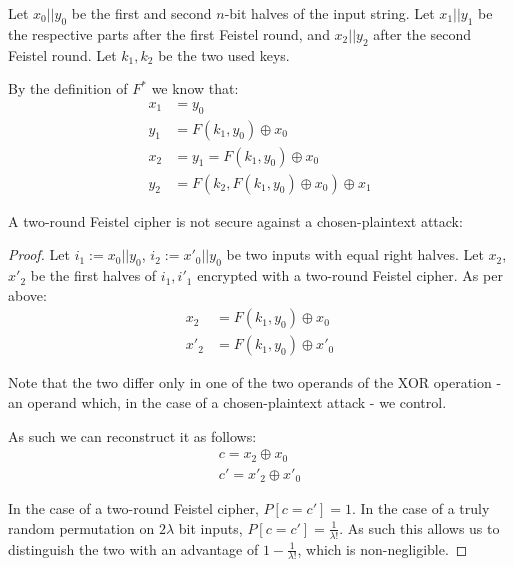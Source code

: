 \documentclass[a4paper]{scrreprt}
\begin{document}
Let $x_0 || y_0$ be the first and second $n$-bit halves of the input string.
Let $x_1 || y_1$ be the respective parts after the first Feistel round, and
$x_2 || y_2$ after the second Feistel round. Let $k_1, k_2$ be the two used
keys.

By the definition of $F^*$ we know that:
\begin{align*}
	x_1 & = y_0 \\
	y_1 & = F(k_1, y_0) \oplus x_0 \\
	x_2 & = y_1 = F(k_1, y_0) \oplus x_0 \\
	y_2 & = F(k_2, F(k_1, y_0) \oplus x_0) \oplus x_1
\end{align*}

A two-round Feistel cipher is not secure against a chosen-plaintext attack:
\begin{proof}
	Let $i_1 := x_0 || y_0$, $i_2 := x'_0 || y_0$ be two inputs with equal
	right halves. Let $x_2$, $x'_2$ be the first halves of $i_1, i'_1$
	encrypted with a two-round Feistel cipher. As per above:
	\begin{align*}
		x_2 & = F(k_1, y_0) \oplus x_0 \\
		x'_2 & = F(k_1, y_0) \oplus x'_0
	\end{align*}

	Note that the two differ only in one of the two operands of the XOR
	operation - an operand which, in the case of a chosen-plaintext attack
	- we control.

	As such we can reconstruct it as follows:
	\begin{align*}
		c = x_2 \oplus x_0 \\
		c' = x'_2 \oplus x'_0
	\end{align*}

	In the case of a two-round Feistel cipher, $P[c = c'] = 1$. In the case
	of a truly random permutation on $2\lambda$ bit inputs, $P[c = c'] =
	\frac{1}{\lambda!}$. As such this allows us to distinguish the two
	with an advantage of $1 - \frac{1}{\lambda!}$, which is non-negligible.
\end{proof}
\end{document}
